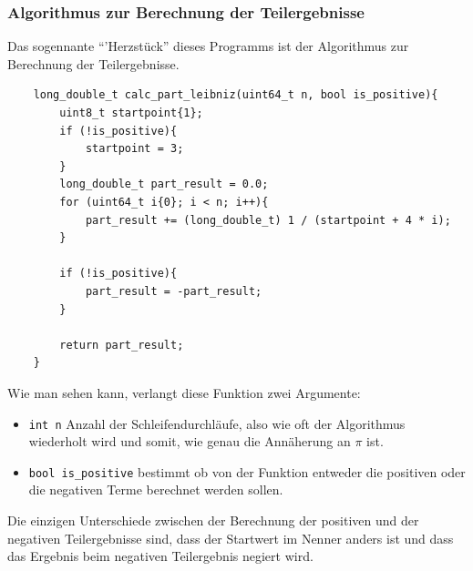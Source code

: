 \documentclass[12pt]{article}
\begin{document}
\subsubsection{Algorithmus zur Berechnung der Teilergebnisse}
Das sogennante "`'Herzstück"' dieses Programms ist der Algorithmus zur
Berechnung der Teilergebnisse.
\newpage
\begin{verbatim}
    long_double_t calc_part_leibniz(uint64_t n, bool is_positive){ 
        uint8_t startpoint{1};
        if (!is_positive){
            startpoint = 3;
        }
        long_double_t part_result = 0.0;
        for (uint64_t i{0}; i < n; i++){
            part_result += (long_double_t) 1 / (startpoint + 4 * i);
        } 

        if (!is_positive){
            part_result = -part_result;
        }

        return part_result;
    }
\end{verbatim}
Wie man sehen kann, verlangt diese Funktion zwei Argumente:
\begin{itemize}
    \item \texttt{int n} Anzahl der Schleifendurchläufe, also wie oft der 
    Algorithmus wiederholt wird und somit, wie genau die Annäherung an $\pi$ 
    ist.
    \item \texttt{bool is\_positive} bestimmt ob von der Funktion entweder
    die positiven oder die negativen Terme berechnet werden sollen.
\end{itemize}
Die einzigen Unterschiede zwischen der Berechnung der positiven und der 
negativen Teilergebnisse sind, dass der Startwert im Nenner anders ist
und dass das Ergebnis beim negativen Teilergebnis negiert wird.
\end{document}

